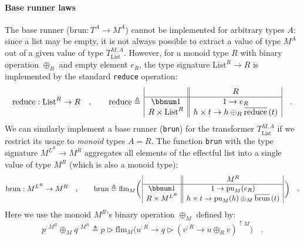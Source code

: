 \paragraph{Base runner laws}

The base runner ($\text{brun}:T^{A}\rightarrow M^{A}$) cannot be
implemented for arbitrary types $A$: since a list may be empty, it
is not always possible to extract a value of type $M^{A}$ out of
a given value of type $T_{\text{List}}^{M,A}$. However, for a monoid
type $R$ with binary operation $\oplus_{R}$ and empty element $e_{R}$,
the type signature $\text{List}^{R}\rightarrow R$ is implemented
by the standard \lstinline!reduce! operation: 
\[
\text{reduce}:\text{List}^{R}\rightarrow R\quad,\quad\quad\text{reduce}\triangleq\,\begin{array}{|c||c|}
 & R\\
\hline \bbnum 1 & 1\rightarrow e_{R}\\
R\times\text{List}^{R} & h\times t\rightarrow h\oplus_{R}\overline{\text{reduce}}\,(t)
\end{array}\quad.
\]
We can similarly implement a base runner (\lstinline!brun!) for the
transformer $T_{\text{List}}^{M,A}$ if we restrict its usage to \emph{monoid}
types $A=R$. The function \lstinline!brun! with the type signature
$M^{L^{R}}\rightarrow M^{R}$ aggregates all elements of the effectful
list into a single value of type $M^{R}$ (which is also a monoid
type):
\[
\text{brun}:M^{L^{R}}\rightarrow M^{R}\quad,\quad\quad\text{brun}\triangleq\text{flm}_{M}\bigg(\,\begin{array}{|c||c|}
 & M^{R}\\
\hline \bbnum 1 & 1\rightarrow\text{pu}_{M}(e_{R})\\
R\times M^{L^{R}} & h\times t\rightarrow\text{pu}_{M}(h)\oplus_{M}\overline{\text{brun}}\,(t)
\end{array}\,\bigg)\quad.
\]
Here we use the monoid $M^{R}$\textsf{'}s binary operation $\oplus_{M}$ defined
by:
\begin{equation}
p^{:M^{R}}\oplus_{M}q^{:M^{R}}\triangleq p\triangleright\text{flm}_{M}\big(u^{:R}\rightarrow q\triangleright(v^{:R}\rightarrow u\oplus_{R}v)^{\uparrow M}\big)\quad.\label{eq:definition-of-oplus-M-monad-monoid-1}
\end{equation}

